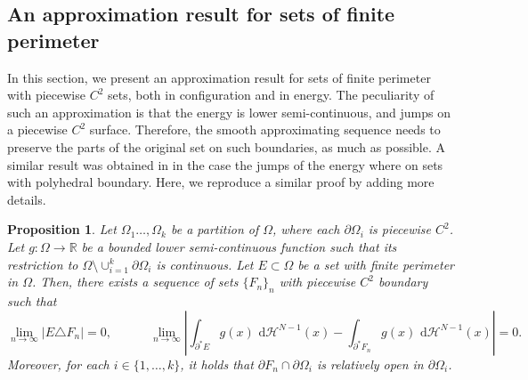 \documentclass[a4paper, 11pt, reqno]{amsart}
\theoremstyle{plain}
\newtheorem{proposition}[theorem]{Proposition}
\theoremstyle{definition}
\theoremstyle{remark}
\newcommand{\R}{\mathbb R}
\newcommand{\dd}{\,\mathrm{d}}
\newcommand{\dhno}{\,\dd{\mathcal H}^{N-1}}
\begin{document}


\subsection{An approximation result for sets of finite perimeter}

In this section, we present an approximation result for sets of finite perimeter with piecewise $C^2$ sets, both in configuration and in energy.
The peculiarity of such an approximation is that the energy is lower semi-continuous, and jumps on a piecewise $C^2$ surface.
Therefore, the smooth approximating sequence needs to preserve the parts of the original set on such boundaries, as much as possible.
A similar result was obtained in \cite[Lemma 5.25]{CriFonGan_moving_sub} in the case the jumps of the energy where on sets with polyhedral boundary.
Here, we reproduce a similar proof by adding more details.

\begin{proposition}\label{prop:approx_sets}
Let $\Omega_1\dots,\Omega_k$ be a partition of $\Omega$, where each $\partial\Omega_i$ is piecewise $C^2$.
Let $g:\Omega\to\R$ be a bounded lower semi-continuous function such that its restriction to $\Omega\setminus\cup_{i=1}^k \partial\Omega_i$ is continuous.
Let $E\subset\Omega$ be a set with finite perimeter in $\Omega$.
Then, there exists a sequence of sets $\{F_n\}_n$ with piecewise $C^2$ boundary such that
\[
\lim_{n\to\infty} |E\triangle F_n|=0,\quad\quad\quad
\lim_{n\to\infty} \left| \int_{\partial^*E} g(x) \dhno(x) 
    - \int_{\partial^*F_n} g(x) \dhno(x) \right| =0.
\]
Moreover, for each $i\in\{1,\dots,k\}$, it holds that $\partial F_n\cap \partial\Omega_i$ is relatively open in $\partial\Omega_i$.
\end{proposition}
\end{document}
